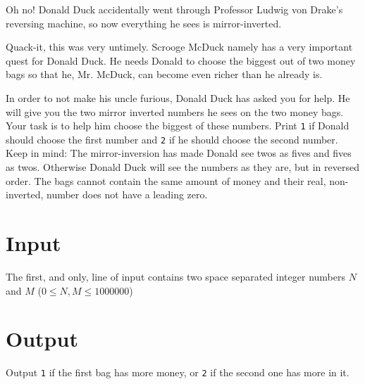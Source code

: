 Oh no! Donald Duck accidentally went through Professor Ludwig von Drake’s reversing machine, so now everything he sees is mirror-inverted.

Quack-it, this was very untimely. Scrooge McDuck namely has a very important quest for Donald Duck. He needs Donald to choose the biggest out of two money bags so that he, Mr. McDuck, can become even richer than he already is.

In order to not make his uncle furious, Donald Duck has asked you for help. He will give you the two
mirror inverted numbers he sees on the two money bags. Your task is to help him choose the biggest
of these numbers. Print \texttt{1} if Donald should choose the first number and \texttt{2} if he should choose the
second number. Keep in mind: The mirror-inversion has made Donald see twos as fives and fives as twos.
Otherwise Donald Duck will see the numbers as they are, but in reversed order. The bags cannot
contain the same amount of money and their real, non-inverted, number does not have a leading zero.

\section*{Input}
The first, and only, line of input contains two space separated integer numbers $N$ and $M$ ($0
\leq N, M \leq 1 000 000$)

\section*{Output}
Output \texttt{1} if the first bag has more money, or \texttt{2} if the second one has more in it.
